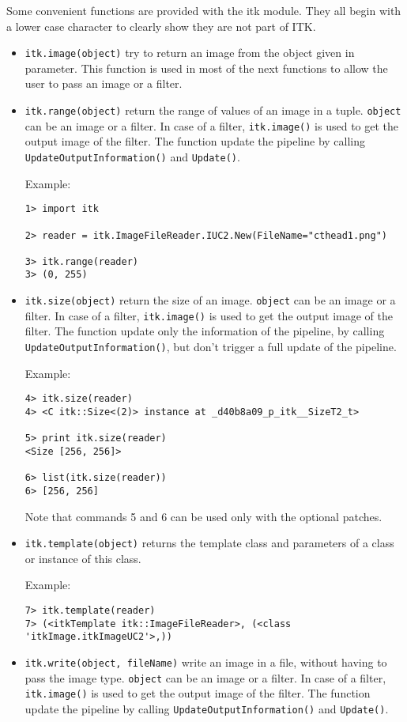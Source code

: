 \documentclass{InsightArticle}
\begin{document}
Some convenient functions are provided with the itk module. They all begin with a lower
case character to clearly show they are not part of ITK.
\begin{itemize}
  \item \verb$itk.image(object)$ try to return an image from the object given in
parameter. This function is used in most of the next functions to allow the user to
pass an image or a filter.

  \item \verb$itk.range(object)$ return the range of values of an image in a tuple.
\verb$object$ can be an image or a filter. In case of a filter, \verb$itk.image()$ is used
to get the output image of the filter. The function update the pipeline by calling
\verb$UpdateOutputInformation()$ and \verb$Update()$.

Example:
\begin{verbatim}
1> import itk

2> reader = itk.ImageFileReader.IUC2.New(FileName="cthead1.png")

3> itk.range(reader)
3> (0, 255)
\end{verbatim}


  \item \verb$itk.size(object)$ return the size of an image.
\verb$object$ can be an image or a filter. In case of a filter, \verb$itk.image()$ is used
to get the output image of the filter. The function update only the information of the
pipeline, by calling \verb$UpdateOutputInformation()$, but don't trigger a full update
of the pipeline.

Example:
\begin{verbatim}
4> itk.size(reader)
4> <C itk::Size<(2)> instance at _d40b8a09_p_itk__SizeT2_t>

5> print itk.size(reader)
<Size [256, 256]>

6> list(itk.size(reader))
6> [256, 256]
\end{verbatim}
Note that commands 5 and 6 can be used only with the optional patches.

  \item \verb$itk.template(object)$ returns the template class and parameters
of a class or instance of this class.

Example:
\begin{verbatim}
7> itk.template(reader)
7> (<itkTemplate itk::ImageFileReader>, (<class 'itkImage.itkImageUC2'>,))
\end{verbatim}

  \item \verb$itk.write(object, fileName)$ write an image in a file, without
having to pass the image type.
\verb$object$ can be an image or a filter. In case of a filter, \verb$itk.image()$ is used
to get the output image of the filter. The function update the pipeline by calling
\verb$UpdateOutputInformation()$ and \verb$Update()$.


\end{itemize}
\end{document}
